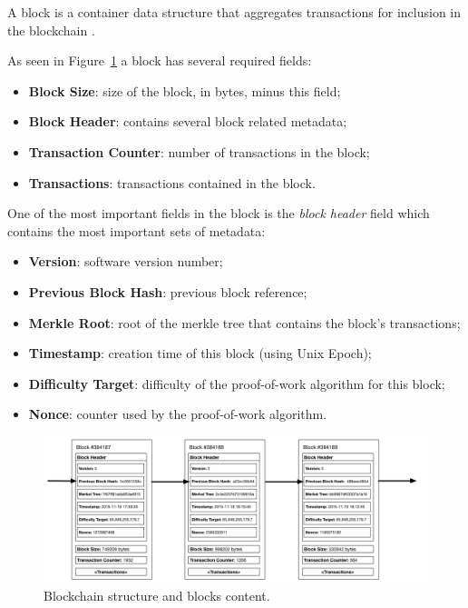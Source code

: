 A block is a container data structure that aggregates transactions for inclusion in the blockchain \cite{Antonopoulos2014}.

As seen in Figure~\ref{fig:blockchain-structure} a block has several required fields:

\begin{itemize}
  \item \textbf{Block Size}: size of the block, in bytes, minus this field;
  \item \textbf{Block Header}: contains several block related metadata;
  \item \textbf{Transaction Counter}: number of transactions in the block;
  \item \textbf{Transactions}: transactions contained in the block.
\end{itemize}
One of the most important fields in the block is the \textit{block header} field which contains the most important sets of metadata:

\begin{itemize}
  \item \textbf{Version}: software version number;
  \item \textbf{Previous Block Hash}: previous block reference;
  \item \textbf{Merkle Root}: root of the merkle tree that contains the block's transactions;
  \item \textbf{Timestamp}: creation time of this block (using Unix Epoch);
  \item \textbf{Difficulty Target}: difficulty of the proof-of-work algorithm for this block;
  \item \textbf{Nonce}: counter used by the proof-of-work algorithm.
\end{itemize}

\begin{figure}
    \includegraphics[width=\linewidth]{Figures/blockchain-structure.png}
    \caption{Blockchain structure and blocks content.}
    \label{fig:blockchain-structure}
\end{figure}

